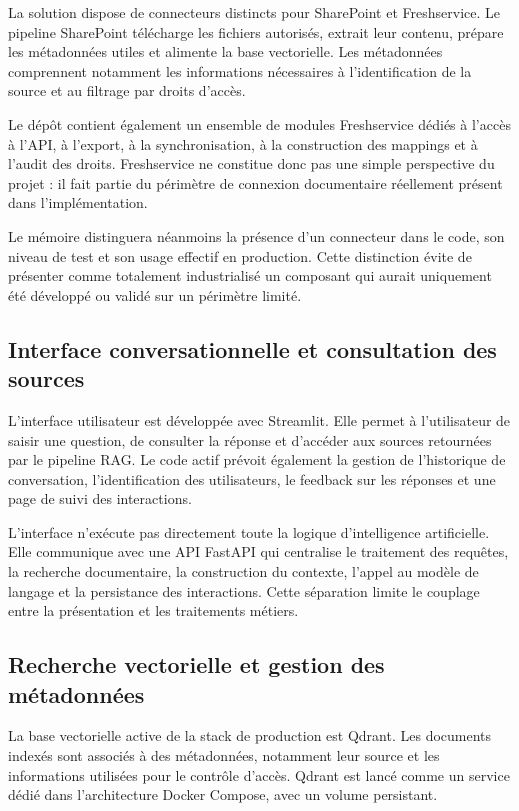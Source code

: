 La solution dispose de connecteurs distincts pour SharePoint et Freshservice. Le pipeline SharePoint télécharge les fichiers autorisés, extrait leur contenu, prépare les métadonnées utiles et alimente la base vectorielle. Les métadonnées comprennent notamment les informations nécessaires à l'identification de la source et au filtrage par droits d'accès.

Le dépôt contient également un ensemble de modules Freshservice dédiés à l'accès à l'API, à l'export, à la synchronisation, à la construction des mappings et à l'audit des droits. Freshservice ne constitue donc pas une simple perspective du projet : il fait partie du périmètre de connexion documentaire réellement présent dans l'implémentation.

Le mémoire distinguera néanmoins la présence d'un connecteur dans le code, son niveau de test et son usage effectif en production. Cette distinction évite de présenter comme totalement industrialisé un composant qui aurait uniquement été développé ou validé sur un périmètre limité.

\subsection{Interface conversationnelle et consultation des sources}

L'interface utilisateur est développée avec Streamlit. Elle permet à l'utilisateur de saisir une question, de consulter la réponse et d'accéder aux sources retournées par le pipeline RAG. Le code actif prévoit également la gestion de l'historique de conversation, l'identification des utilisateurs, le feedback sur les réponses et une page de suivi des interactions.

L'interface n'exécute pas directement toute la logique d'intelligence artificielle. Elle communique avec une API FastAPI qui centralise le traitement des requêtes, la recherche documentaire, la construction du contexte, l'appel au modèle de langage et la persistance des interactions. Cette séparation limite le couplage entre la présentation et les traitements métiers.

\subsection{Recherche vectorielle et gestion des métadonnées}

La base vectorielle active de la stack de production est Qdrant. Les documents indexés sont associés à des métadonnées, notamment leur source et les informations utilisées pour le contrôle d'accès. Qdrant est lancé comme un service dédié dans l'architecture Docker Compose, avec un volume persistant.

